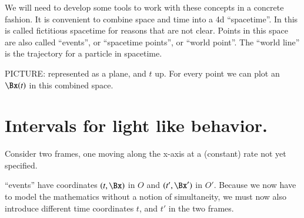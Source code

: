 %
%


We will need to develop some tools to work with these concepts in a concrete fashion.  It is convenient to combine space  and time  into a 4d ``spacetime''.  In \citep{landau1980classical} this is called fictitious spacetime for reasons that are not clear.  Points in this space are also called ``events'', or ``spacetime points'', or ``world point''.  The ``world line'' is the trajectory for a particle in spacetime.

PICTURE:  represented as a plane, and \(t\) up.  For every point we can plot an \(\Bx(t)\) in this combined space.
%
\section{Intervals for light like behavior.}

Consider two frames, one moving along the x-axis at a (constant) rate not yet specified.

``events'' have coordinates \((t, \Bx)\) in \(O\) and \((t', \Bx')\) in \(O'\).  Because we now have to model the mathematics without a notion of simultaneity, we must now also introduce different time coordinates \(t\), and \(t'\) in the two frames.

